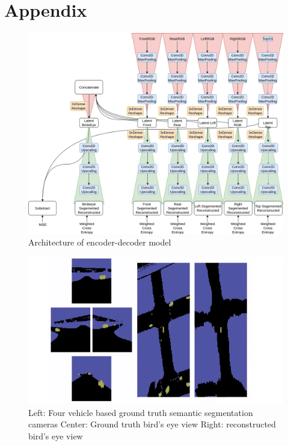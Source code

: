 \documentclass[letterpaper, 10 pt, conference]{ieeeconf}  %
\begin{document}
\section{Appendix}
\begin{figure}[thpb]
	\centering
	\includegraphics[scale=.35]{encoder_decoder_arc.png}
	\caption{Architecture of encoder-decoder model}
	\label{figurelabel}
\end{figure}
\begin{figure}[thpb]
	\centering
	\includegraphics[scale=.5]{sem_reconstructed.png}
	\caption{Left: Four vehicle based ground truth semantic segmentation cameras \newline
	Center: Ground truth bird's eye view \newline
	Right: reconstructed bird's eye view}
	\label{figurelabel}
\end{figure}




\endgroup
\end{document}
